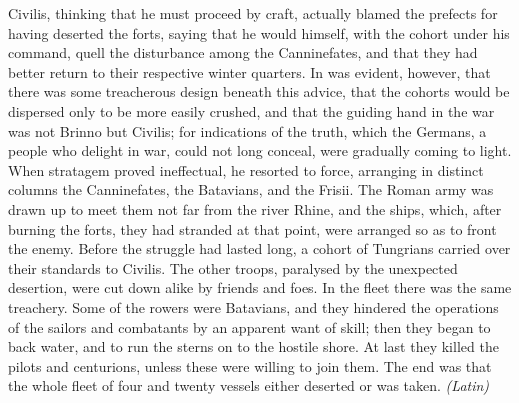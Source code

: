 Civilis, thinking that he must proceed by craft, actually blamed the prefects for having deserted the forts, saying that he would himself, with the cohort under his command, quell the disturbance among the Canninefates, and that they had better return to their respective winter quarters. In was evident, however, that there was some treacherous design beneath this advice, that the cohorts would be dispersed only to be more easily crushed, and that the guiding hand in the war was not Brinno but Civilis; for indications of the truth, which the Germans, a people who delight in war, could not long conceal, were gradually coming to light. When stratagem proved ineffectual, he resorted to force, arranging in distinct columns the Canninefates, the Batavians, and the Frisii. The Roman army was drawn up to meet them not far from the river Rhine, and the ships, which, after burning the forts, they had stranded at that point, were arranged so as to front the enemy. Before the struggle had lasted long, a cohort of Tungrians carried over their standards to Civilis. The other troops, paralysed by the unexpected desertion, were cut down alike by friends and foes. In the fleet there was the same treachery. Some of the rowers were Batavians, and they hindered the operations of the sailors and combatants by an apparent want of skill; then they began to back water, and to run the sterns on to the hostile shore. At last they killed the pilots and centurions, unless these were willing to join them. The end was that the whole fleet of four and twenty vessels either deserted or was taken. \emph{(Latin)}



